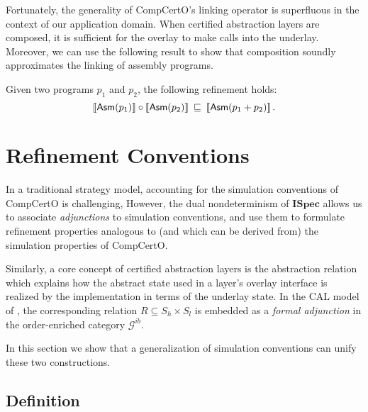 \documentclass[sigplan,10pt,authordraft]{acmart}
\newcommand{\ISpec}{\mathbf{ISpec}}
\begin{document}
Fortunately,
the generality of CompCertO's linking operator is superfluous
in the context of our application domain.
When certified abstraction layers are composed,
it is sufficient for the overlay to make calls into the underlay.
Moreover,
we can use the following result
to show that composition soundly approximates
the linking of assembly programs.

\begin{lemma}
Given two  programs $p_1$ and $p_2$,
the following refinement holds:
\[
  \llbracket  \mathsf{Asm} (p_1) \rrbracket \circ
  \llbracket  \mathsf{Asm} (p_2) \rrbracket \:\sqsubseteq\:
  \llbracket  \mathsf{Asm} (p_1 + p_2) \rrbracket
  \,.
\]
\end{lemma}


\section{Refinement Conventions} \label{sec:refconv} %

In a traditional strategy model,
accounting for the simulation conventions of CompCertO is challenging,
However,
the dual nondeterminism of $\ISpec$
allows us to associate \emph{adjunctions}
to simulation conventions,
and use them to formulate refinement properties
analogous to (and which can be derived from)
the simulation properties of CompCertO.

Similarly,
a core concept of certified abstraction layers
is the abstraction relation
which explains how the abstract state
used in a layer's overlay interface
is realized by the implementation
in terms of the underlay state.
In the CAL model of \citep{lics20},
the corresponding relation $R \subseteq S_h \times S_l$
is embedded as a \emph{formal adjunction}
in the order-enriched category $\mathcal{G}^{ib}$.

In this section we show that a generalization of
simulation conventions can unify these two constructions.

\subsection{Definition} \label{sec:refconvdef} %
\end{document}
